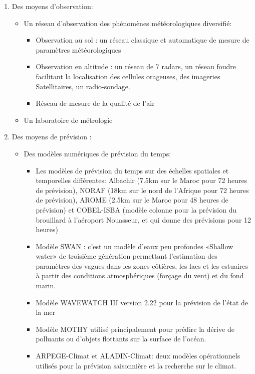 \begin{enumerate}
\item Des moyens d'observation:
    \begin{itemize}
    \item[\ding{224}] Un réseau d'observation des phénomènes météorologiques diversifié:
        \begin{itemize}
        \item[\ding{74}] Observation au sol : un réseau classique et automatique de mesure de paramètres météorologiques
        \item[\ding{74}] Observation en altitude : un réseau de 7 radars, un réseau foudre facilitant la localisation des cellules orageuses, des imageries Satellitaires, un radio-sondage.
        \item[\ding{74}] Réseau de mesure de la qualité de l'air
        \end{itemize}
    \item[\ding{224}] Un laboratoire de métrologie
    \end{itemize}
\item Des moyens de prévision :
    \begin{itemize}
     \item[\ding{224}] Des modèles numériques de prévision du temps:
     \begin{itemize}
        \item[\ding{74}] Les modèles de prévision du temps sur des échelles spatiales et temporelles différentes: Albachir (7.5km sur le Maroc pour 72 heures de prévision), NORAF (18km sur le nord de l'Afrique pour 72 heures de prévision), AROME (2.5km sur le Maroc pour 48 heures de prévision) et COBEL-ISBA (modèle colonne pour la prévision du brouillard à l'aéroport Nouasseur, et qui donne des prévisions pour 12 heures)
        \item[\ding{74}] Modèle SWAN : c'est un modèle d'eaux peu profondes «Shallow water» de troisième génération permettant l’estimation des paramètres des vagues dans les zones côtières, les lacs et les estuaires à partir des conditions atmosphériques (forçage du vent) et du fond marin.
        \item[\ding{74}] Modèle WAVEWATCH III version 2.22 pour la prévision de l’état de la mer
        \item[\ding{74}] Modèle MOTHY utilisé principalement pour prédire la dérive de polluants ou d'objets flottants sur la surface de l'océan.
        \item[\ding{74}] ARPEGE-Climat et ALADIN-Climat: deux modèles opérationnels utilisés pour la prévision saisonnière et la recherche sur le climat.

\end{itemize}
\end{itemize}
\end{enumerate}
